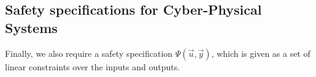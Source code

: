 \documentclass[runningheads,a4paper]{llncs}
\begin{document}
\subsection{Safety specifications for Cyber-Physical Systems}
\label{ssec:safety}

Finally, we also require a safety specification $\Psi(\vec{u},\vec{y})$, which is
given as a set of linear constraints over the inputs and outputs.



\end{document}

